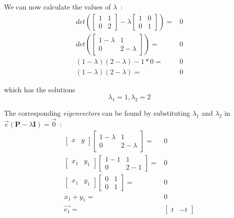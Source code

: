 \documentclass[11pt,twocolumn]{amsart} %
\begin{document}
We can now calculate the values of $\lambda$~:
\begin{align*}
  det(\begin{bmatrix} 1 & 1 \\ 0 & 2\end{bmatrix} - \lambda \begin{bmatrix} 1 & 0 \\ 0 & 1 \end{bmatrix}) = & 0 \\
  det(\begin{bmatrix} 1-\lambda & 1 \\ 0 & 2-\lambda\end{bmatrix}) = & 0 \\
  (1-\lambda)(2-\lambda) - 1 * 0 = & 0 \\
  (1-\lambda)(2-\lambda) = & 0
\end{align*}

which has the solutions
\begin{equation*}
\lambda_1 = 1, \lambda_2 = 2
\end{equation*}

The corresponding \emph{eigenvectors} can be found by substituting $\lambda_1$ and $\lambda_2$ in $\vec{e} (\textbf{P} - \lambda \textbf{I}) = \vec{0}$~:
\begin{align*}
  \begin{bmatrix} x & y \end{bmatrix} \begin{bmatrix} 1-\lambda & 1 \\ 0 & 2-\lambda \end{bmatrix} = & 0 \\
  \begin{bmatrix} x_1 & y_1 \end{bmatrix} \begin{bmatrix} 1-1 & 1 \\ 0 & 2-1 \end{bmatrix} = & 0 \\
  \begin{bmatrix} x_1 & y_1 \end{bmatrix} \begin{bmatrix} 0 & 1 \\ 0 & 1 \end{bmatrix} = & 0 \\
  x_1 + y_1 = & 0 \\
  \vec{e_1} = & \begin{bmatrix} t & -t \end{bmatrix}
\end{align*}
\end{document}
